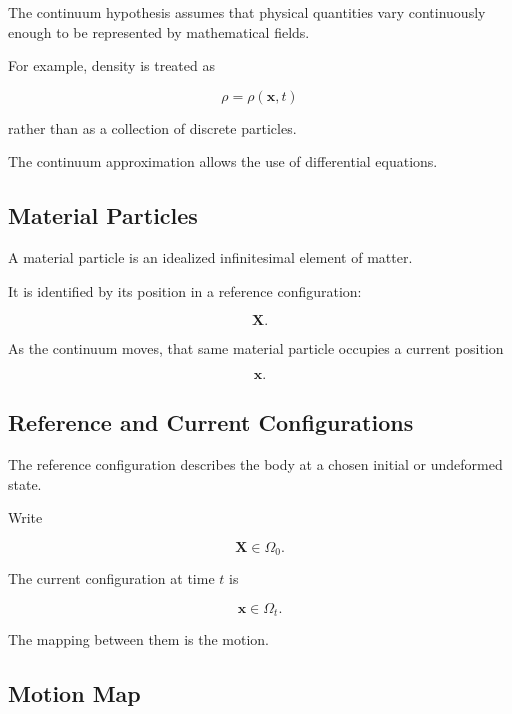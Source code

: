 The continuum hypothesis assumes that physical quantities vary continuously
enough to be represented by mathematical fields.

For example, density is treated as

\[
\boxed{
\rho
=
\rho(\mathbf{x},t)
}
\]

rather than as a collection of discrete particles.

The continuum approximation allows the use of differential equations.

\subsection{Material Particles}
\label{subsec:material-particles}

A material particle is an idealized infinitesimal element of matter.

It is identified by its position in a reference configuration:

\[
\boxed{
\mathbf{X}.
}
\]

As the continuum moves, that same material particle occupies a current
position

\[
\boxed{
\mathbf{x}.
}
\]

\subsection{Reference and Current Configurations}
\label{subsec:reference-current-configurations}

The reference configuration describes the body at a chosen initial or
undeformed state.

Write

\[
\boxed{
\mathbf{X}
\in
\Omega_0.
}
\]

The current configuration at time \(t\) is

\[
\boxed{
\mathbf{x}
\in
\Omega_t.
}
\]

The mapping between them is the motion.

\subsection{Motion Map}
\label{subsec:continuum-motion-map}

